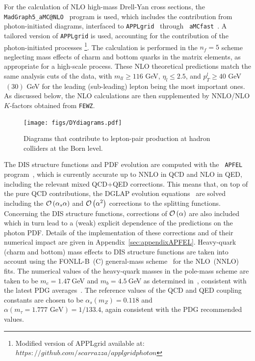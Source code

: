 For the calculation of NLO high-mass Drell-Yan cross sections, the
{\tt MadGraph5{\_}aMC@NLO}~\cite{Alwall:2014hca} program is used, which
includes the contribution from photon-initiated diagrams, interfaced
to {\tt APPLgrid}~\cite{Carli:2010rw} through {\tt
  aMCfast}~\cite{amcfast}.
%
A tailored version of {\tt APPLgrid} is used, accounting for
the contribution of the photon-initiated processes \footnote{Modified version of APPLgrid available at: $https://github.com/scarrazza/applgridphoton$}.
%
The calculation is performed in the $n_f=5$ scheme neglecting mass
effects of charm and bottom quarks in the matrix elements, as
appropriate for a high-scale process.
%
These NLO theoretical predictions match the same 
analysis cuts of the data, with $m_{ll}\ge 116$ GeV, $\eta_l\le 2.5$, and
$p_T^l \ge 40$ GeV$~(30)$ GeV for the leading (sub-leading) lepton being
the most important ones.
%
As discussed below, the NLO calculations are then supplemented by
NNLO/NLO $K$-factors obtained from {\tt FEWZ}.

\begin{figure}[t]
  \begin{center}
    \texttt{[image: figs/DYdiagrams.pdf]}
    \end{center}
    \caption{Diagrams that contribute to lepton-pair production at
      hadron colliders at the Born level.}
\label{fig:photoninduced}
\end{figure}

The DIS structure functions and PDF evolution are computed with the {\tt
  APFEL} program~\cite{Bertone:2013vaa}, which is currently accurate
up to NNLO in QCD and NLO in QED, including the relevant mixed
QCD+QED corrections.
%
This means that, on top of the pure QCD
contributions, the DGLAP evolution
equations~\cite{Gribov:1972ri,Dokshitzer:1977,Altarelli:1977zs} are
solved including the $\mathcal{O}\left( \alpha_s\alpha\right)$ and
$\mathcal{O}\left( \alpha^2\right)$ corrections to the splitting functions.
%
Concerning the DIS structure functions, corrections of
$\mathcal{O}\left( \alpha\right)$ are also included which in turn lead to a (weak)
explicit dependence of the predictions on the photon PDF.
%
Details
of the implementation of these corrections and of their numerical
impact are given in Appendix~\ref{sec:appendixAPFEL}.
%
Heavy-quark (charm and bottom) mass effects to DIS structure functions
are taken into account using the FONLL-B~(C) general-mass
scheme~\cite{Forte:2010ta} for the NLO~(NNLO) fits.
%
The numerical values of the heavy-quark masses in the pole-mass
scheme
are taken to be $m_c=1.47~$GeV and $m_b=4.5~$GeV as determined in~\cite{Abramowicz:2015mha},  
consistent with the latest PDG averages~\cite{Agashe:2014kda}.
%
The reference values of the QCD and QED coupling constants are chosen to be
$\alpha_s(m_Z)=0.118$ and $\alpha(m_\tau=1.777\mbox{ GeV})=1/133.4$, again consistent
with the PDG recommended values.


